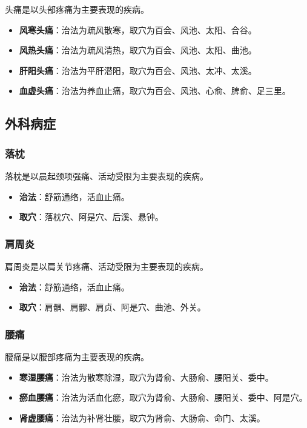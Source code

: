 \documentclass[12pt,UTF8]{ctexbook}
\begin{document}
头痛是以头部疼痛为主要表现的疾病。

\begin{itemize}
\item \textbf{风寒头痛}：治法为疏风散寒，取穴为百会、风池、太阳、合谷。
\item \textbf{风热头痛}：治法为疏风清热，取穴为百会、风池、太阳、曲池。
\item \textbf{肝阳头痛}：治法为平肝潜阳，取穴为百会、风池、太冲、太溪。
\item \textbf{血虚头痛}：治法为养血止痛，取穴为百会、风池、心俞、脾俞、足三里。
\end{itemize}

\subsection{外科病症}

\subsubsection{落枕}

落枕是以晨起颈项强痛、活动受限为主要表现的疾病。

\begin{itemize}
\item \textbf{治法}：舒筋通络，活血止痛。
\item \textbf{取穴}：落枕穴、阿是穴、后溪、悬钟。
\end{itemize}

\subsubsection{肩周炎}

肩周炎是以肩关节疼痛、活动受限为主要表现的疾病。

\begin{itemize}
\item \textbf{治法}：舒筋通络，活血止痛。
\item \textbf{取穴}：肩髃、肩髎、肩贞、阿是穴、曲池、外关。
\end{itemize}

\subsubsection{腰痛}

腰痛是以腰部疼痛为主要表现的疾病。

\begin{itemize}
\item \textbf{寒湿腰痛}：治法为散寒除湿，取穴为肾俞、大肠俞、腰阳关、委中。
\item \textbf{瘀血腰痛}：治法为活血化瘀，取穴为肾俞、大肠俞、腰阳关、委中、阿是穴。
\item \textbf{肾虚腰痛}：治法为补肾壮腰，取穴为肾俞、大肠俞、命门、太溪。
\end{itemize}
\end{document}
